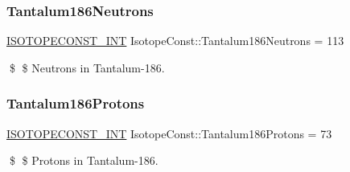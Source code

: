\subsubsection{\texorpdfstring{Tantalum186\+Neutrons}{Tantalum186Neutrons}}
{\footnotesize\ttfamily \mbox{\hyperlink{group___isotope_const-_macros_ga5f18360b3e99483a35c32d789e62621c}{I\+S\+O\+T\+O\+P\+E\+C\+O\+N\+S\+T\+\_\+\+I\+NT}} Isotope\+Const\+::\+Tantalum186\+Neutrons = 113}

\$ \$ Neutrons in Tantalum-\/186. \mbox{\label{group___isotope_const-_tantalum-_ta186_gaed2de6d25ca00e4ec86fc85c555ce2bf}} 
\subsubsection{\texorpdfstring{Tantalum186\+Protons}{Tantalum186Protons}}
{\footnotesize\ttfamily \mbox{\hyperlink{group___isotope_const-_macros_ga5f18360b3e99483a35c32d789e62621c}{I\+S\+O\+T\+O\+P\+E\+C\+O\+N\+S\+T\+\_\+\+I\+NT}} Isotope\+Const\+::\+Tantalum186\+Protons = 73}

\$ \$ Protons in Tantalum-\/186. 